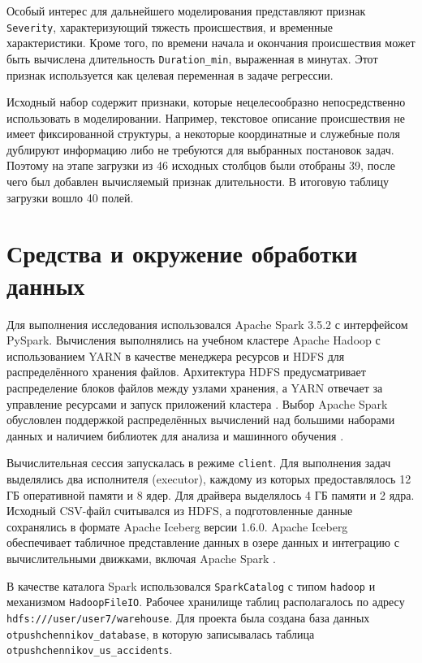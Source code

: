 Особый интерес для дальнейшего моделирования представляют признак \texttt{Severity}, характеризующий тяжесть происшествия, и временные характеристики. Кроме того, по времени начала и окончания происшествия может быть вычислена длительность \texttt{Duration\_min}, выраженная в минутах. Этот признак используется как целевая переменная в задаче регрессии.

Исходный набор содержит признаки, которые нецелесообразно непосредственно использовать в моделировании. Например, текстовое описание происшествия не имеет фиксированной структуры, а некоторые координатные и служебные поля дублируют информацию либо не требуются для выбранных постановок задач. Поэтому на этапе загрузки из 46 исходных столбцов были отобраны 39, после чего был добавлен вычисляемый признак длительности. В итоговую таблицу загрузки вошло 40 полей.

\vspace{\baselineskip}
\section{Средства и окружение обработки данных}
\vspace{\baselineskip}

Для выполнения исследования использовался Apache Spark 3.5.2 с интерфейсом PySpark. Вычисления выполнялись на учебном кластере Apache Hadoop с использованием YARN в качестве менеджера ресурсов и HDFS для распределённого хранения файлов. Архитектура HDFS предусматривает распределение блоков файлов между узлами хранения, а YARN отвечает за управление ресурсами и запуск приложений кластера \cite{hadoop336hdfs, hadoop336yarn, white2013hadoop}. Выбор Apache Spark обусловлен поддержкой распределённых вычислений над большими наборами данных и наличием библиотек для анализа и машинного обучения \cite{spark2022official, karau2015spark, perrin2021spark, spark352pyspark}.

Вычислительная сессия запускалась в режиме \texttt{client}. Для выполнения задач выделялись два исполнителя (executor), каждому из которых предоставлялось 12 ГБ оперативной памяти и 8 ядер. Для драйвера выделялось 4 ГБ памяти и 2 ядра. Исходный CSV-файл считывался из HDFS, а подготовленные данные сохранялись в формате Apache Iceberg версии 1.6.0. Apache Iceberg обеспечивает табличное представление данных в озере данных и интеграцию с вычислительными движками, включая Apache Spark \cite{apacheIceberg, zaharia2021lakehouse}.

В качестве каталога Spark использовался \texttt{SparkCatalog} с типом \texttt{hadoop} и механизмом \texttt{HadoopFileIO}. Рабочее хранилище таблиц располагалось по адресу \texttt{hdfs:///user/user7/warehouse}. Для проекта была создана база данных \texttt{otpushchennikov\_database}, в которую записывалась таблица \texttt{otpushchennikov\_us\_accidents}.

